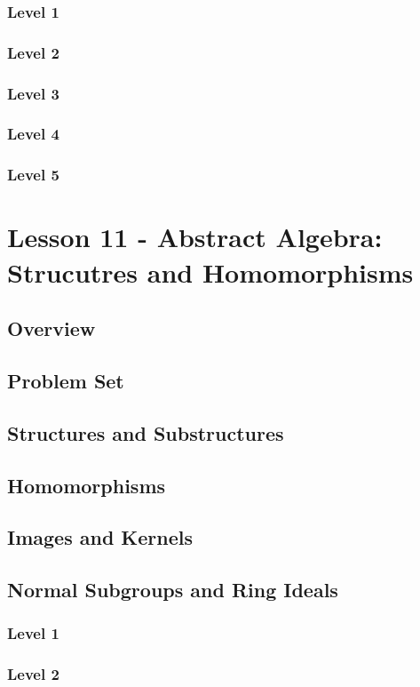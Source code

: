 \documentclass{article}
\begin{document}
\subsubsection{Level 1}
\subsubsection{Level 2}
\subsubsection{Level 3}
\subsubsection{Level 4}
\subsubsection{Level 5}
\pagebreak

\section{Lesson 11 - Abstract Algebra: Strucutres and Homomorphisms}
\subsection{Overview}
\subsection{Problem Set}
\subsection{Structures and Substructures}
\subsection{Homomorphisms}
\subsection{Images and Kernels}
\subsection{Normal Subgroups and Ring Ideals}
\subsubsection{Level 1}
\subsubsection{Level 2}
\end{document}
